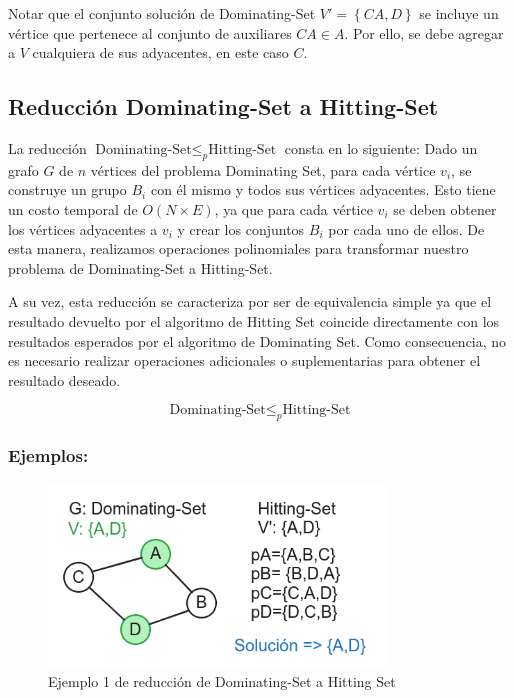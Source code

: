 Notar que el conjunto solución de Dominating-Set $V'=\left\{CA,D\right\}$ se incluye un vértice que pertenece al conjunto de auxiliares $CA \in A$. Por ello, se debe agregar a $V$ cualquiera de sus adyacentes, en este caso $C$.

\subsection{Reducción Dominating-Set a Hitting-Set}

La reducción $\text{Dominating-Set} \leq_{p} \text{Hitting-Set}$ consta en lo siguiente:
Dado un grafo $G$ de $n$ vértices del problema Dominating Set, para cada vértice $v_{i}$, se construye un grupo $B_{i}$ con él mismo y todos sus vértices adyacentes. Esto tiene un costo temporal de $O(N \times E)$, ya que para cada vértice $v_{i}$ se deben obtener los vértices adyacentes a $v_{i}$ y crear los conjuntos $B_{i}$ por cada uno de ellos. De esta manera, realizamos operaciones polinomiales para transformar nuestro problema de Dominating-Set a Hitting-Set. 

A su vez, esta reducción se caracteriza por ser de equivalencia simple ya que el resultado devuelto por el algoritmo de Hitting Set coincide directamente con los resultados esperados por el algoritmo de Dominating Set. Como consecuencia, no es necesario realizar operaciones adicionales o suplementarias para obtener el resultado deseado.

\[\text{Dominating-Set}  \leq _{p} \text{Hitting-Set}\]

\subsubsection{Ejemplos:} 

\begin{figure}[H]
    \centering
    \includegraphics[width=0.8\textwidth]{img/ejemplo1_DS-HS.png}
    \caption{Ejemplo 1 de reducción de Dominating-Set a Hitting Set}
    \label{fig:ejemplo1_DS-HS}
\end{figure}


